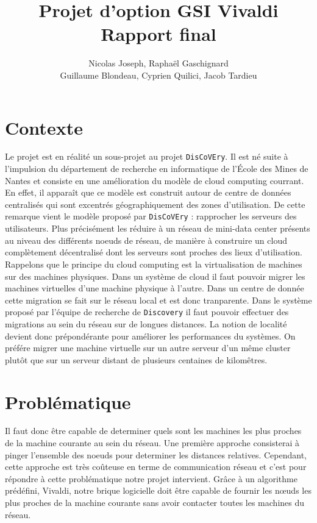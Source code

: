 \documentclass[11pt,a4paper]{article}
\title{Projet d'option GSI Vivaldi \\ Rapport final}
\author{Nicolas Joseph, Raphaël Gaschignard\\ Guillaume Blondeau, Cyprien Quilici, Jacob Tardieu}
\begin{document}
\maketitle
\section{Contexte}

Le projet est en réalité un sous-projet au projet \texttt{DisCoVEry}. Il est né suite à l’impulsion du département de recherche en informatique de l'École des Mines de Nantes et consiste en une amélioration du modèle de cloud computing courrant. En effet, il apparaît que ce modèle est construit autour de centre de données centralisés qui sont excentrés géographiquement des zones d’utilisation. De cette remarque vient  le modèle proposé par \texttt{DisCoVEry} : rapprocher les serveurs des utilisateurs. Plus précisément les réduire à un réseau de mini-data center présents au niveau des différents noeuds de réseau, de manière à construire un cloud complètement décentralisé dont les serveurs sont proches des lieux d'utilisation.\\

Rappelons que le principe du cloud computing est la virtualisation de machines sur des machines physiques. Dans un système de cloud il faut pouvoir migrer les machines virtuelles d'une machine physique à l'autre. Dans un centre de donnée cette migration se fait sur le réseau local et est donc tranparente. Dans le système proposé par l'équipe de recherche de \texttt{Discovery} il faut pouvoir effectuer des migrations au sein du réseau sur de longues distances. La notion de localité devient donc prépondérante pour améliorer les performances du systèmes. On préfére migrer une machine virtuelle sur un autre serveur d'un même cluster plutôt que sur un serveur distant de plusieurs centaines de kilomêtres. 

\section{Problématique}
Il faut donc être capable de determiner quels sont les machines les plus proches de la machine courante au sein du réseau. Une première approche consisterai à pinger l'ensemble des noeuds pour determiner les distances relatives. Cependant, cette approche est très coûteuse en terme de communication réseau et c'est pour répondre à cette problématique notre projet intervient. Grâce à un algorithme prédéfini, Vivaldi, notre brique logicielle doit être capable de fournir les n\oe uds les plus proches de la machine courante sans avoir contacter toutes les machines du réseau.\\
\end{document}
